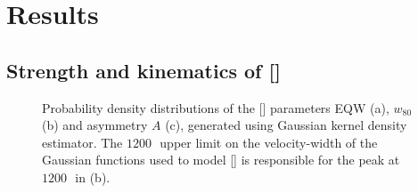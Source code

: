 \section{Results}

\subsection{Strength and kinematics of []}
\label{sec:ch4-basicresults}

\begin{figure}
    \captionsetup[subfigure]{labelformat=empty}
    \centering
    \subfloat[\label{fig:parameter_hists_a}]{}
    \subfloat[\label{fig:parameter_hists_b}]{}
    \subfloat[\label{fig:parameter_hists_c}]{}
    \caption[{Probability density distributions of the [] parameters EQW, $w_{80}$ and asymmetry $A$.}]{Probability density distributions of the [] parameters EQW (a), $w_{80}$ (b) and asymmetry $A$ (c), generated using Gaussian kernel density estimator. The $1200$\,\kms\, upper limit on the velocity-width of the Gaussian functions used to model [] is responsible for the peak at $1200$\,\kms\, in (b).}     
    \label{fig:parameter_hists}
\end{figure}

